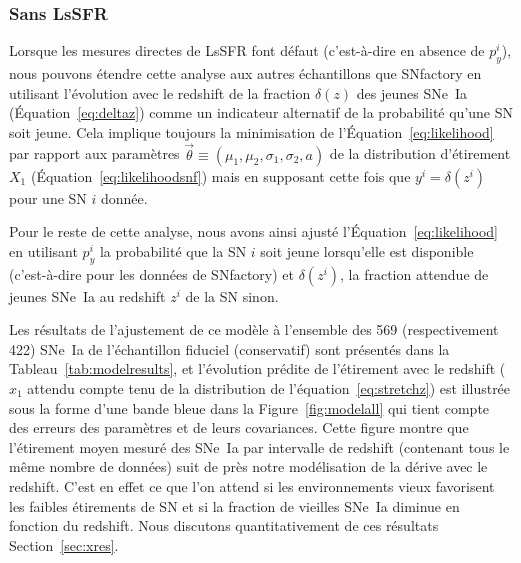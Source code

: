 \documentclass[../main/main.tex]{subfiles}
\begin{document}
\subsubsection*{Sans LsSFR}\label{sssec:z}

Lorsque les mesures directes de LsSFR font défaut (c'est-à-dire en absence de
$p_y^i$), nous pouvons étendre cette analyse aux autres échantillons que
SNfactory en utilisant l'évolution avec le redshift de la fraction $\delta(z)$
des jeunes SNe~Ia (Équation~\ref{eq:deltaz}) comme un indicateur alternatif de
la probabilité qu'une SN soit jeune. Cela implique toujours la minimisation de
l'Équation~\ref{eq:likelihood} par rapport aux paramètres 
$\overrightarrow{\theta}\equiv(\mu_1, \mu_2, \sigma_1, \sigma_2, a)$ de la
distribution d'étirement $X_1$ (Équation~\ref{eq:likelihoodsnf}) mais en
supposant cette fois que $y^i = \delta(z^i)$ pour une SN $i$ donnée.

Pour le reste de cette analyse, nous avons ainsi ajusté
l'Équation~\ref{eq:likelihood} en utilisant $p_y^i$ la probabilité que la SN $i$
soit jeune lorsqu'elle est disponible (c'est-à-dire pour les données de
SNfactory) et $\delta(z^i)$, la fraction attendue de jeunes SNe~Ia au redshift
$z^i$ de la SN sinon.\bigbreak

Les résultats de l'ajustement de ce modèle à l'ensemble des 569 (respectivement
422) SNe~Ia de l'échantillon fiduciel (conservatif) sont présentés dans la
Tableau~\ref{tab:modelresults}, et l'évolution prédite de l'étirement avec le
redshift ($x_1$ attendu compte tenu de la distribution de
l'équation~\ref{eq:stretchz}) est illustrée sous la forme d'une bande bleue dans
la Figure~\ref{fig:modelall} qui tient compte des erreurs des paramètres et de
leurs covariances. Cette figure montre que l'étirement moyen mesuré des SNe~Ia
par intervalle de redshift (contenant tous le même nombre de données) suit de
près notre modélisation de la dérive avec le redshift. C'est en effet ce que
l'on attend si les environnements vieux favorisent les faibles étirements de SN
\citep[voir par exemple][]{howell2007} et si la fraction de vieilles SNe~Ia
diminue en fonction du redshift. Nous discutons quantitativement de ces
résultats Section~\ref{sec:xres}.
\end{document}
